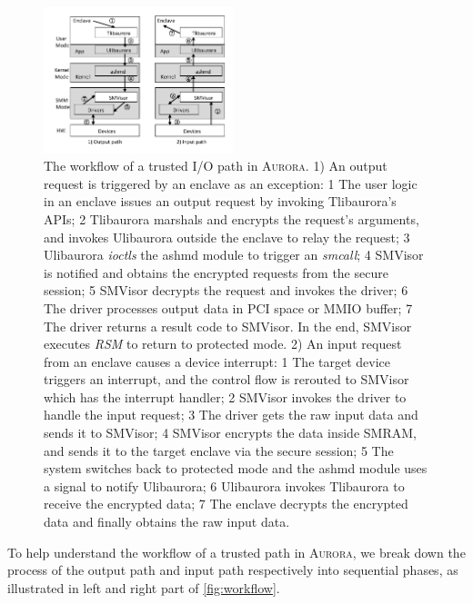 \documentclass[journal,twocolumn,letterpaper,10pt]{IEEEtran}
\begin{document}
\begin{figure}
	\centering
	\includegraphics[width=0.49\textwidth]{figures/workflow.pdf} %
	\caption{The workflow of a trusted I/O path in \textsc{Aurora}. %
	1) An output request is triggered by an enclave as an exception:
\textcircled{\scriptsize{1}} The user logic in an enclave issues an output request by invoking  Tlibaurora's APIs;
\textcircled{\scriptsize{2}} Tlibaurora marshals and encrypts the request's arguments, and invokes Ulibaurora outside the enclave to relay the request;
\textcircled{\scriptsize{3}} Ulibaurora \emph{ioctls} the ashmd module to trigger an \textit{smcall};
\textcircled{\scriptsize{4}} SMVisor is notified and obtains the encrypted requests from the secure session;
\textcircled{\scriptsize{5}} SMVisor decrypts the request and invokes the driver;
\textcircled{\scriptsize{6}} The driver processes output data in PCI space or MMIO buffer;
\textcircled{\scriptsize{7}} The driver returns a result code to SMVisor. In the end, SMVisor executes \textit{RSM} to return to protected mode. 
	2) An input request from an enclave causes a device interrupt:
\textcircled{\scriptsize{1}} The target device triggers an interrupt, and the control flow is rerouted to SMVisor which has the interrupt handler;
\textcircled{\scriptsize{2}} SMVisor invokes the driver to handle the input request;
\textcircled{\scriptsize{3}} The driver gets the raw input data and sends it to SMVisor;
\textcircled{\scriptsize{4}} SMVisor encrypts the data inside SMRAM, and sends it to the target enclave via the secure session;
\textcircled{\scriptsize{5}} The system switches back to protected mode and the ashmd module uses a signal to notify Ulibaurora;
\textcircled{\scriptsize{6}} Ulibaurora invokes Tlibaurora to receive the encrypted data;
\textcircled{\scriptsize{7}} The enclave decrypts the encrypted data and finally obtains the raw input data.
	}
	\label{fig:workflow}
\end{figure}

To help understand the workflow of a trusted path in \textsc{Aurora}, we break down the process of the output path and input path respectively into sequential phases, as illustrated in left and right part of \autoref{fig:workflow}.
\end{document}
